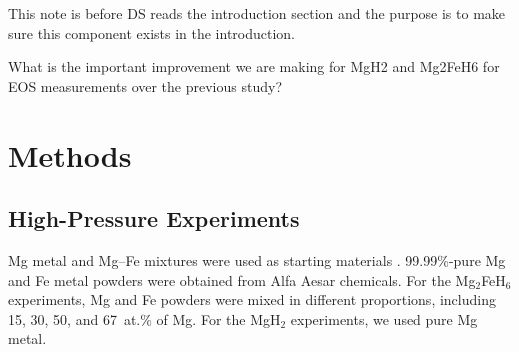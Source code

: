 \documentclass[draft,jgrga,12pt]{agujournal2019}
\begin{document}



\begin{cbox}
    This note is before DS reads the introduction section and the purpose is to make sure this component exists in the introduction.

    What is the important improvement we are making for MgH2 and Mg2FeH6 for EOS measurements over the previous study?\\
\end{cbox}


\section{Methods}

\subsection{High-Pressure Experiments}

Mg metal and Mg–Fe mixtures were used as starting materials .
99.99\%-pure Mg and Fe metal powders were obtained from Alfa Aesar chemicals. 
For the Mg$_2$FeH$_6$ experiments, Mg and Fe powders were mixed in different proportions, including 15, 30, 50, and 67~{at.\%} of Mg. 
For the MgH$_2$ experiments, we used pure Mg metal.
\end{document}
